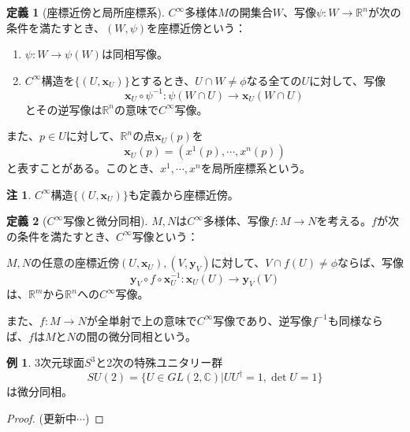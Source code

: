 \documentclass[unicode,a4paper,11pt]{ltjsarticle}
\theoremstyle{definition}
\newtheorem{dfn}{定義}[section]
\newtheorem{exm}{例}[section]
\newtheorem{rmk}{注}[section]
\begin{document}
\begin{dfn}[座標近傍と局所座標系]
  $C^{\infty}$多様体$M$の開集合$W$、写像$\psi:W\rightarrow\mathbb{R}^{n}$が次の条件を満たすとき、$(W,\psi)$を座標近傍という：
  \begin{enumerate}
    \item
          $\psi:W\rightarrow\psi(W)$は同相写像。
    \item
          $C^{\infty}$構造を$\{(U,\bm{x}_{U})\}$とするとき、$U\cap W\neq\phi$なる全ての$U$に対して、写像
          \begin{equation}
            \bm{x}_{U}\circ\psi^{-1}
            :
            \psi(W\cap U)\rightarrow \bm{x}_{U}(W\cap U)
          \end{equation}
          とその逆写像は$\mathbb{R}^{n}$の意味で$C^{\infty}$写像。
  \end{enumerate}

  また、$p\in U$に対して、$\mathbb{R}^{n}$の点$\bm{x}_{U}(p)$を
  \begin{equation}
    \bm{x}_{U}(p)
    =
    (x^{1}(p),\cdots,x^{n}(p))
  \end{equation}
  と表すことがある。このとき、$x^{1},\cdots,x^{n}$を局所座標系という。
\end{dfn}

\begin{rmk}
  $C^{\infty}$構造$\{(U,\bm{x}_{U})\}$も定義から座標近傍。
\end{rmk}

\begin{dfn}[$C^{\infty}$写像と微分同相]
  $M,N$は$C^{\infty}$多様体、写像$f:M\rightarrow N$を考える。$f$が次の条件を満たすとき、$C^{\infty}$写像という：
  \begin{flushleft}
    $M,N$の任意の座標近傍$(U,\bm{x}_{U}),(V,\bm{y}_{V})$に対して、$V\cap f(U)\neq\phi$ならば、写像
    \begin{equation}
      \bm{y}_{V}\circ f\circ\bm{x}_{U}^{-1}
      :
      \bm{x}_{U}(U)\rightarrow\bm{y}_{V}(V)
    \end{equation}
    は、$\mathbb{R}^{m}$から$\mathbb{R}^{n}$への$C^{\infty}$写像。
  \end{flushleft}
  また、$f:M\rightarrow N$が全単射で上の意味で$C^{\infty}$写像であり、逆写像$f^{-1}$も同様ならば、$f$は$M$と$N$の間の微分同相という。
\end{dfn}

\begin{exm}
  3次元球面$S^{3}$と2次の特殊ユニタリー群
  \begin{equation}
    SU(2)
    =
    \{U\in GL(2,\mathbb{C})|UU^{\dag}=1,\det U=1\}
  \end{equation}
  は微分同相。
  \begin{proof}
    (更新中$\cdots$)
  \end{proof}
\end{exm}
\end{document}
